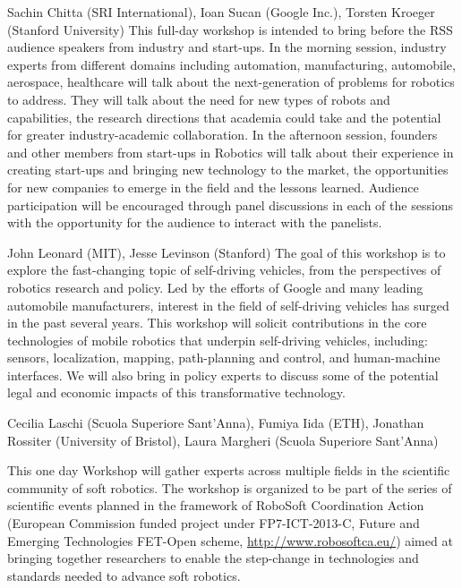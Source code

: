 \begin{spacing}{1.0}
{Sachin Chitta (SRI International), Ioan Sucan (Google Inc.), Torsten Kroeger (Stanford University)}
{
This full-day workshop is intended to bring before the RSS audience speakers from industry and start-ups. In the morning session, industry experts from different domains including automation, manufacturing, automobile, aerospace, healthcare will talk about the next-generation of problems for robotics to address. They will talk about the need for new types of robots and capabilities, the research directions that academia could take and the potential for greater industry-academic collaboration. In the afternoon session, founders and other members from start-ups in Robotics will talk about their experience in creating start-ups and bringing new technology to the market, the opportunities for new companies to emerge in the field and the lessons learned. Audience participation will be encouraged through panel discussions in each of the sessions with the opportunity for the audience to interact with the panelists.
}


{John Leonard (MIT), Jesse Levinson (Stanford)}
{
The goal of this workshop is to explore the fast-changing topic of self-driving vehicles, from the perspectives of robotics research and policy.  Led by the efforts of Google and many leading automobile manufacturers, interest in the field of self-driving vehicles has surged in the past several years.  This workshop will solicit contributions in the core technologies of mobile robotics that underpin self-driving vehicles, including: sensors, localization, mapping, path-planning and control, and human-machine interfaces.  We will also bring in policy experts  to discuss some of the potential legal and economic impacts of this transformative technology.
}

\clearpage
{}
{Cecilia Laschi (Scuola Superiore Sant'Anna), Fumiya Iida (ETH), Jonathan Rossiter (University of Bristol), Laura Margheri (Scuola Superiore Sant'Anna)}
{
This one day Workshop will gather experts across multiple fields in the scientific community of soft robotics. The workshop is organized to be part of the series of scientific events planned in the framework of RoboSoft Coordination Action (European Commission funded project under FP7-ICT-2013-C, Future and Emerging Technologies FET-Open scheme, \url{http://www.robosoftca.eu/}) aimed at bringing together researchers to enable the step-change in technologies and standards needed to advance soft robotics.

}
\end{spacing}
